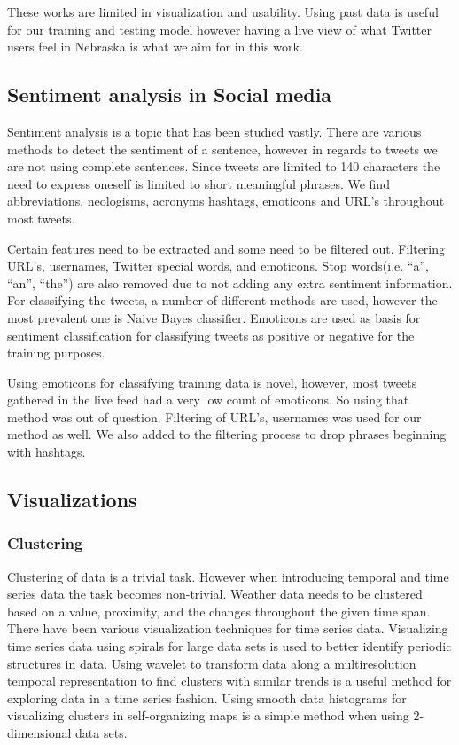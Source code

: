 \documentclass[journal]{vgtc}                %
\begin{document}
These works are limited in visualization and usability. Using past data is useful for our training and testing model however having a live view of what Twitter users feel in Nebraska is what we aim for in this work.


\subsection{Sentiment analysis in Social media}
Sentiment analysis is a topic that has been studied vastly. There are various methods to detect the sentiment of a sentence, however in regards to tweets we are not using complete sentences. Since tweets are limited to 140 characters the need to express oneself is limited to short meaningful phrases. We find abbreviations, neologisms, acronyms hashtags, emoticons and URL's throughout most tweets.

Certain features need to be extracted and some need to be filtered out. Filtering URL's, usernames, Twitter special words, and emoticons. \cite{keller2005warm} Stop words(i.e. “a”, “an”, “the”) are also removed due to not adding any extra sentiment information.  For classifying the tweets, a number of different methods are used, however the most prevalent one is Naive Bayes classifier. \cite{keller2005warm} Emoticons are used as basis for sentiment classification for classifying tweets as positive or negative for the training purposes. \cite{jain2010data,keller2005warm}

Using emoticons for classifying training data is novel, however, most tweets gathered in the live feed had a very low count of emoticons. So using that method was out of question. Filtering of URL's, usernames was used for our method as well. We also added to the filtering process to drop phrases beginning with hashtags.

\subsection{Visualizations}

\subsubsection{Clustering}
Clustering of data is a trivial task. However when introducing  temporal and time series data the task becomes non-trivial. Weather data needs to be clustered based on a value, proximity, and the changes throughout the given time span. There have been various visualization techniques for time series data. Visualizing time series data using spirals for large data sets is used to better identify periodic structures in data. \cite{pak2010twitter} Using wavelet to transform data along a multiresolution temporal representation to find clusters with similar trends is a useful method for exploring data in a time series fashion. \cite{li2014nasty} Using smooth data histograms for visualizing clusters in self-organizing maps is a simple method when using 2-dimensional data sets.\cite{pampalk2002using}
\end{document}
